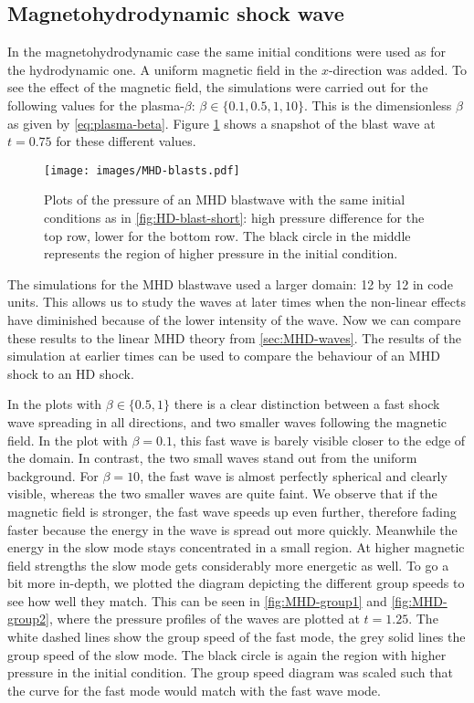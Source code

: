 \subsection{Magnetohydrodynamic shock wave}
In the magnetohydrodynamic case the same initial conditions were used as for the hydrodynamic one.
A uniform magnetic field in the $x$-direction was added. 
To see the effect of the magnetic field, the simulations were carried out for the following values for the plasma-$\beta$: $\beta \in \{0.1, 0.5,1,10\}$.
This is the dimensionless $\beta$ as given by \cref{eq:plasma-beta}.
Figure \ref{fig:MHD-blasts} shows a snapshot of the blast wave at $t=0.75$ for these different values.

\begin{figure}[H]
	\centering
	\texttt{[image: images/MHD-blasts.pdf]}
	\caption{Plots of the pressure of an MHD blastwave with the same initial conditions as in \cref{fig:HD-blast-short}: high pressure difference for the top row, lower for the bottom row.
	The black circle in the middle represents the region of higher pressure in the initial condition.}
	\label{fig:MHD-blasts}
\end{figure}

The simulations for the MHD blastwave used a larger domain: 12 by 12 in code units.
This allows us to study the waves at later times when the non-linear effects have diminished because of the lower intensity of the wave.
Now we can compare these results to the linear MHD theory from \cref{sec:MHD-waves}.
The results of the simulation at earlier times can be used to compare the behaviour of an MHD shock to an HD shock.

In the plots with $\beta \in \{0.5,1\}$ there is a clear distinction between a fast shock wave spreading in all directions, and two smaller waves following the magnetic field.
In the plot with $\beta=0.1$, this fast wave is barely visible closer to the edge of the domain. In contrast, the two small waves stand out from the uniform background.
For $\beta=10$, the fast wave is almost perfectly spherical and clearly visible, whereas the two smaller waves are quite faint.
We observe that if the magnetic field is stronger, the fast wave speeds up even further, therefore fading faster because the energy in the wave is spread out more quickly.
Meanwhile the energy in the slow mode stays concentrated in a small region.
At higher magnetic field strengths the slow mode gets considerably more energetic as well.
To go a bit more in-depth, we plotted the diagram depicting the different group speeds to see how well they match. 
This can be seen in \cref{fig:MHD-group1} and \cref{fig:MHD-group2}, where the pressure profiles of the waves are plotted at $t=1.25$.
The white dashed lines show the group speed of the fast mode, the grey solid lines the group speed of the slow mode. 
The black circle is again the region with higher pressure in the initial condition.
The group speed diagram was scaled such that the curve for the fast mode would match with the fast wave mode.


